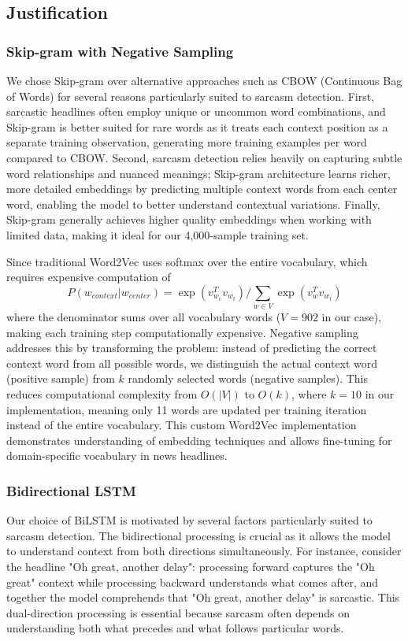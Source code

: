 \documentclass[11pt]{article}
\begin{document}
\subsection{Justification}

\subsubsection{Skip-gram with Negative Sampling}
We chose Skip-gram over alternative approaches such as CBOW (Continuous Bag of Words) for several reasons particularly suited to sarcasm detection. First, sarcastic headlines often employ unique or uncommon word combinations, and Skip-gram is better suited for rare words as it treats each context position as a separate training observation, generating more training examples per word compared to CBOW. Second, sarcasm detection relies heavily on capturing subtle word relationships and nuanced meanings; Skip-gram architecture learns richer, more detailed embeddings by predicting multiple context words from each center word, enabling the model to better understand contextual variations. Finally, Skip-gram generally achieves higher quality embeddings when working with limited data, making it ideal for our 4,000-sample training set.

\noindent Since traditional Word2Vec uses softmax over the entire vocabulary, which requires expensive computation of 
\begin{equation}
   P(w_{context}|w_{center}) = \exp(v_{w_c}^T v_{w_t})/\sum_{w \in V} \exp(v_w^T v_{w_t})
\end{equation}
 where the denominator sums over all vocabulary words ($V = 902$ in our case), making each training step computationally expensive. Negative sampling addresses this by transforming the problem: instead of predicting the correct context word from all possible words, we distinguish the actual context word (positive sample) from $k$ randomly selected words (negative samples). This reduces computational complexity from $O(|V|)$ to $O(k)$, where $k=10$ in our implementation, meaning only 11 words are updated per training iteration instead of the entire vocabulary. This custom Word2Vec implementation demonstrates understanding of embedding techniques and allows fine-tuning for domain-specific vocabulary in news headlines.

\subsubsection{Bidirectional LSTM}
Our choice of BiLSTM is motivated by several factors particularly suited to sarcasm detection. The bidirectional processing is crucial as it allows the model to understand context from both directions simultaneously. For instance, consider the headline "Oh great, another delay": processing forward captures the "Oh great" context while processing backward understands what comes after, and together the model comprehends that "Oh great, another delay" is sarcastic. This dual-direction processing is essential because sarcasm often depends on understanding both what precedes and what follows particular words.
\end{document}
